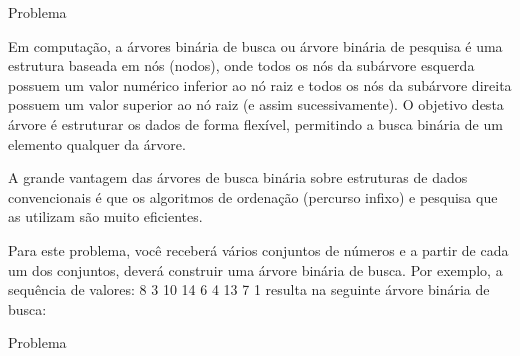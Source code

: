 
\begin{frame}[fragile]{Problema}

Em computação, a árvores binária de busca ou árvore binária de pesquisa é uma estrutura baseada em nós (nodos), onde todos os nós da subárvore esquerda possuem um valor numérico inferior ao nó raiz e todos os nós da subárvore direita possuem um valor superior ao nó raiz (e assim sucessivamente). O objetivo desta árvore é estruturar os dados de forma flexível, permitindo a busca binária de um elemento qualquer da árvore.

A grande vantagem das árvores de busca binária sobre estruturas de dados convencionais é que os algoritmos de ordenação (percurso infixo) e pesquisa que as utilizam são muito eficientes.

Para este problema, você receberá vários conjuntos de números e a partir de cada um dos conjuntos, deverá construir uma árvore binária de busca. Por exemplo, a sequência de valores: 8 3 10 14 6 4 13 7 1 resulta na seguinte árvore binária de busca:

\end{frame}

\begin{frame}[fragile]{Problema}


\end{frame}


